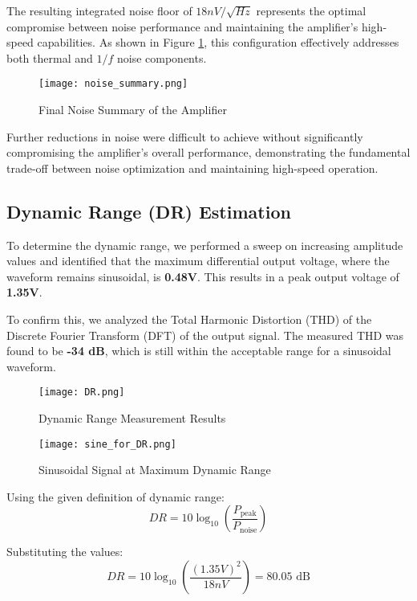 \documentclass[a4paper,12pt]{article}
\begin{document}
The resulting integrated noise floor of $18 nV/\sqrt{Hz}$  represents the optimal compromise between noise performance and maintaining the amplifier's high-speed capabilities. As shown in Figure \ref{fig:noise_summary}, this configuration effectively addresses both thermal and $1/f$ noise components.

\begin{figure}[H]
\centering
\texttt{[image: noise\_summary.png]}
\caption{Final Noise Summary of the Amplifier}
\label{fig:noise_summary}
\end{figure}

Further reductions in noise were difficult to achieve without significantly compromising the amplifier's overall performance, demonstrating the fundamental trade-off between noise optimization and maintaining high-speed operation.


\subsection{Dynamic Range (DR) Estimation}

To determine the dynamic range, we performed a sweep on increasing amplitude values and identified that the maximum differential output voltage, where the waveform remains sinusoidal, is \textbf{0.48V}. This results in a peak output voltage of \textbf{1.35V}.

To confirm this, we analyzed the Total Harmonic Distortion (THD) of the Discrete Fourier Transform (DFT) of the output signal. The measured THD was found to be \textbf{-34 dB}, which is still within the acceptable range for a sinusoidal waveform.

\begin{figure}[H]
\centering
\texttt{[image: DR.png]}
\caption{Dynamic Range Measurement Results}
\label{fig:dr}
\end{figure}

\begin{figure}[H]
\centering
\texttt{[image: sine\_for\_DR.png]}
\caption{Sinusoidal Signal at Maximum Dynamic Range}
\label{fig:sine_dr}
\end{figure}

Using the given definition of dynamic range:
\begin{equation}
DR = 10 \log_{10} \left( \frac{P_{\text{peak}}}{P_{\text{noise}}} \right)
\end{equation}

Substituting the values:
\begin{equation}
DR = 10 \log_{10} \left( \frac{(1.35V)^2}{18nV} \right) = 80.05 \text{ dB}
\end{equation}
\end{document}
